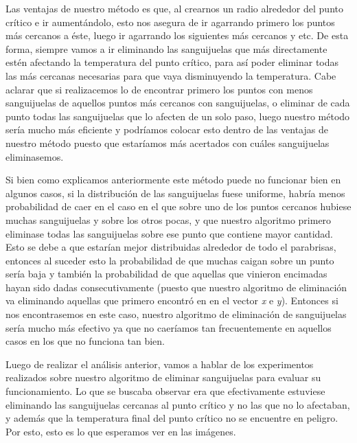 \documentclass[10pt, a4paper]{article}
\begin{document}
Las ventajas de nuestro m\'etodo es que, al crearnos un radio alrededor del punto cr\'itico e ir aument\'andolo, esto nos asegura de ir agarrando primero los puntos m\'as cercanos a \'este, luego ir agarrando los siguientes m\'as cercanos y etc. De esta forma, siempre vamos a ir eliminando las sanguijuelas que m\'as directamente est\'en afectando la temperatura del punto cr\'itico, para as\'i poder eliminar todas las m\'as cercanas necesarias para que vaya disminuyendo la temperatura. Cabe aclarar que si realizacemos lo de encontrar primero los puntos con menos sanguijuelas de aquellos puntos m\'as cercanos con sanguijuelas, o eliminar de cada punto todas las sanguijuelas que lo afecten de un solo paso, luego nuestro m\'etodo ser\'ia mucho m\'as eficiente y podr\'iamos colocar esto dentro de las ventajas de nuestro m\'etodo puesto que estar\'iamos m\'as acertados con cu\'ales sanguijuelas eliminasemos. 

Si bien como explicamos anteriormente este m\'etodo puede no funcionar bien en algunos casos, si la distribuci\'on de las sanguijuelas fuese uniforme, habr\'ia menos probabilidad de caer en el caso en el que sobre uno de los puntos cercanos hubiese muchas sanguijuelas y sobre los otros pocas, y que nuestro algoritmo primero eliminase todas las sanguijuelas sobre ese punto que contiene mayor cantidad. Esto se debe a que estar\'ian mejor distribuidas alrededor de todo el parabrisas, entonces al suceder esto la probabilidad de que muchas caigan sobre un punto ser\'ia baja y tambi\'en la probabilidad de que aquellas que vinieron encimadas hayan sido dadas consecutivamente (puesto que nuestro algoritmo de eliminaci\'on va eliminando aquellas que primero encontr\'o en en el vector \textit{x} e \textit{y}). Entonces si nos encontrasemos en este caso, nuestro algoritmo de eliminaci\'on de sanguijuelas ser\'ia mucho m\'as efectivo ya que no caer\'iamos tan frecuentemente en aquellos casos en los que no funciona tan bien. 

Luego de realizar el an\'alisis anterior, vamos a hablar de los experimentos realizados sobre nuestro algoritmo de eliminar sanguijuelas para evaluar su funcionamiento. Lo que se buscaba observar era que efectivamente estuviese eliminando las sanguijuelas cercanas al punto cr\'itico y no las que no lo afectaban, y adem\'as que la temperatura final del punto cr\'itico no se encuentre en peligro. Por esto, esto es lo que esperamos ver en las im\'agenes.
\end{document}
